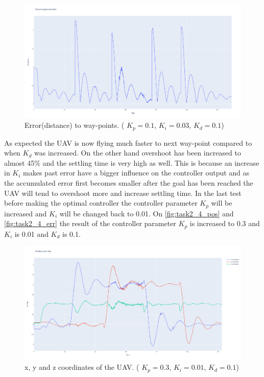 \documentclass[conference]{IEEEtran}
\begin{document}
\begin{figure}[hbtp]
	\centering
	\includegraphics[width=1.0\linewidth]{images/task2_3_err.png}
	\caption{Error(distance) to way-points. ( $K_p = 0.1$, $K_i = 0.03$, $K_d = 0.1$)}
	\label{fig:task2_3_err}
\end{figure}

As expected the UAV is now flying much faster to next way-point compared to when $K_d$ was increased. On the other hand overshoot has been increased to almost 45\% and the settling time is very high as well. This is because an increase in $K_i$ makes past error have a bigger influence on the controller output and as the accumulated error first becomes smaller after the goal has been reached the UAV will tend to overshoot more and increase settling time. 
In the last test before making the optimal controller the controller parameter $K_p$ will be increased and $K_i$ will be changed back to 0.01. On \cref{fig:task2_4_pos} and \cref{fig:task2_4_err} the result of the controller parameter $K_p$ is increased to 0.3 and $K_i$ is 0.01 and $K_d$ is 0.1.

\begin{figure}[hbtp]
	\centering
	\includegraphics[width=1.0\linewidth]{images/task2_2_pos.png}
	\caption{x, y and z coordinates of the UAV. ( $K_p = 0.3$, $K_i = 0.01$, $K_d = 0.1$)}
	\label{fig:task2_2_pos}
\end{figure}
\end{document}
